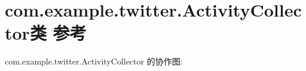 \hypertarget{classcom_1_1example_1_1twitter_1_1_activity_collector}{}\section{com.\+example.\+twitter.\+Activity\+Collector类 参考}
\label{classcom_1_1example_1_1twitter_1_1_activity_collector}


com.\+example.\+twitter.\+Activity\+Collector 的协作图\+:
